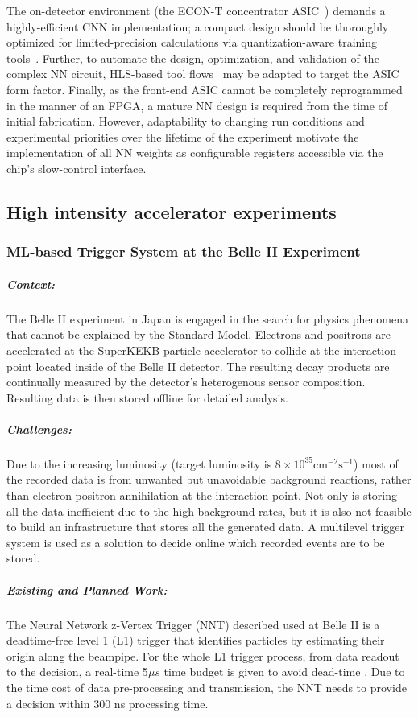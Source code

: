 The on-detector environment (the ECON-T concentrator ASIC~\cite{collaboration:2017gbu}) demands a highly-efficient CNN implementation; a compact design should be thoroughly optimized for limited-precision calculations via quantization-aware training tools~\cite{qkeraspaper}.
Further, to automate the design, optimization, and validation of the complex NN circuit, HLS-based tool flows~\cite{Duarte:2018ite} may be adapted to target the ASIC form factor.
Finally, as the front-end ASIC cannot be completely reprogrammed in the manner of an FPGA, a mature NN design is required from the time of initial fabrication.
However, adaptability to changing run conditions and experimental priorities over the lifetime of the experiment motivate the implementation of all NN weights as configurable registers accessible via the chip's slow-control interface.

\subsection{High intensity accelerator experiments}
\subsubsection{ML-based Trigger System at the Belle II Experiment}
\subparagraph*{Context:} The Belle II experiment in Japan is engaged in the search for physics phenomena that cannot be explained by the Standard Model. Electrons and positrons are accelerated at the SuperKEKB particle accelerator to collide at the interaction point located inside of the Belle II detector. 
The resulting decay products are continually measured by the detector’s heterogenous sensor composition. Resulting data is then stored offline for detailed analysis. 

\subparagraph*{Challenges:} Due to the increasing luminosity (target luminosity is $8\times10^{35}\mathrm{cm}^{-2}\mathrm{s}^{-1}$) most of the recorded data is from unwanted but unavoidable background reactions, rather than electron-positron annihilation at the interaction point.  Not only is storing all the data inefficient due to the high background rates, but it is also not feasible to build an infrastructure that stores all the generated data. A multilevel trigger system is used as a solution to decide online which recorded events are to be stored. 

\subparagraph*{Existing and Planned Work:} The Neural Network z-Vertex Trigger (NNT) described used at Belle II is a deadtime-free level 1 (L1) trigger that identifies particles by estimating their origin along the beampipe. For the whole L1 trigger process, from data readout to the decision, a real-time 5$\mu s$ time budget is given to avoid dead-time \cite{Lai_2020}. Due to the time cost of data pre-processing and transmission, the NNT needs to provide a decision within 300 ns processing time.

